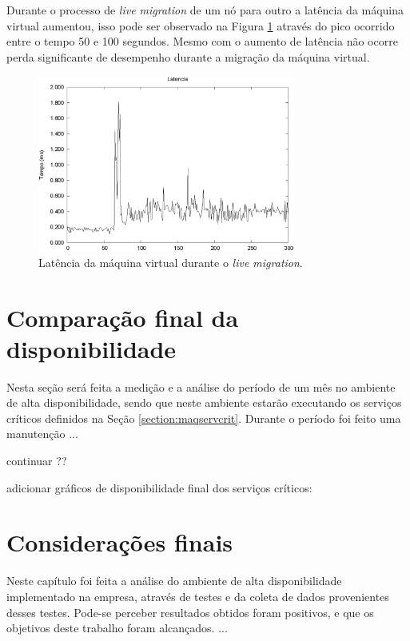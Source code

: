 Durante o processo de \textit{live migration} de um nó para outro a latência da máquina virtual aumentou, isso pode ser observado na Figura 
\ref{fig:teste2_latencia} através do pico ocorrido entre o tempo 50 e 100 segundos. Mesmo com o aumento de latência não ocorre 
perda significante de desempenho durante a migração da máquina virtual.
\begin{figure}[h!]
 \centering
 \includegraphics[width=320px]{img/teste2_latencia.eps}
 \caption{Latência da máquina virtual durante o \textit{live migration}.}
 \label{fig:teste2_latencia}
\end{figure}



\section{Comparação final da disponibilidade}
\label{section:comparacaofinal}

Nesta seção será feita a medição e a análise do período de um mês no ambiente de alta disponibilidade, sendo que neste ambiente estarão executando 
os serviços críticos definidos na Seção \ref{section:maqservcrit}.
Durante o período foi feito uma manutenção ...

continuar ??

adicionar gráficos de disponibilidade final dos serviços críticos:



\section{Considerações finais}

Neste capítulo foi feita a análise do ambiente de alta disponibilidade implementado na empresa, através de testes e da coleta de dados
provenientes desses testes. Pode-se perceber resultados obtidos foram positivos, e que os objetivos deste trabalho foram alcançados. 
...
